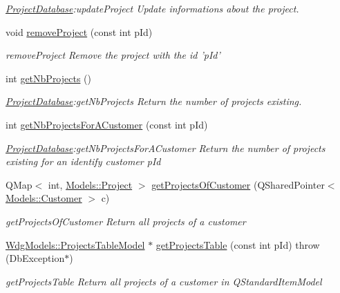 \begin{DoxyCompactItemize}
\begin{DoxyCompactList}\small\item\em \hyperlink{classDatabases_1_1ProjectDatabase}{Project\-Database}\-:update\-Project Update informations about the project. \end{DoxyCompactList}\item 
void \hyperlink{classDatabases_1_1ProjectDatabase_abdd5fcb1913c2d2f375a658f6656c522}{remove\-Project} (const int p\-Id)
\begin{DoxyCompactList}\small\item\em remove\-Project Remove the project with the id 'p\-Id' \end{DoxyCompactList}\item 
int \hyperlink{classDatabases_1_1ProjectDatabase_aa486ad21f156a8ba7d08baef29e0aaea}{get\-Nb\-Projects} ()
\begin{DoxyCompactList}\small\item\em \hyperlink{classDatabases_1_1ProjectDatabase}{Project\-Database}\-:get\-Nb\-Projects Return the number of projects existing. \end{DoxyCompactList}\item 
int \hyperlink{classDatabases_1_1ProjectDatabase_a9e9a1fb58e4e90fcc568d1c171b863ff}{get\-Nb\-Projects\-For\-A\-Customer} (const int p\-Id)
\begin{DoxyCompactList}\small\item\em \hyperlink{classDatabases_1_1ProjectDatabase}{Project\-Database}\-:get\-Nb\-Projects\-For\-A\-Customer Return the number of projects existing for an identify customer {\itshape p\-Id} \end{DoxyCompactList}\item 
Q\-Map$<$ int, \hyperlink{classModels_1_1Project}{Models\-::\-Project} $>$ \hyperlink{classDatabases_1_1ProjectDatabase_acf044f95bd4df4e04bff9ef52d326704}{get\-Projects\-Of\-Customer} (Q\-Shared\-Pointer$<$ \hyperlink{classModels_1_1Customer}{Models\-::\-Customer} $>$ c)
\begin{DoxyCompactList}\small\item\em get\-Projects\-Of\-Customer Return all projects of a customer \end{DoxyCompactList}\item 
\hyperlink{classGui_1_1Widgets_1_1WdgModels_1_1ProjectsTableModel}{Wdg\-Models\-::\-Projects\-Table\-Model} $\ast$ \hyperlink{classDatabases_1_1ProjectDatabase_ac00628f2d8911298dcb0292f6c4cff66}{get\-Projects\-Table} (const int p\-Id)  throw (\-Db\-Exception$\ast$)
\begin{DoxyCompactList}\small\item\em get\-Projects\-Table Return all projects of a customer in Q\-Standard\-Item\-Model \end{DoxyCompactList}\item 

\end{DoxyCompactItemize}
